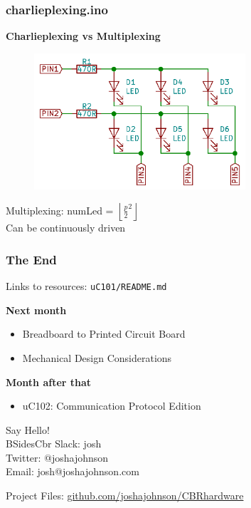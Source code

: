\documentclass[t]{beamer}
\begin{document}

\begin{frame}[t]
\frametitle{charlieplexing.ino}
\textbf{Charlieplexing vs Multiplexing}

\begin{figure}
	\includegraphics[width=0.7\textwidth]{multiPlexing.png}
\end{figure}
\centering
Multiplexing: numLed = $\left \lfloor{\frac{p}{2}^2}\right \rfloor$ \\
Can be continuously driven 

\end{frame}



\begin{frame}
\frametitle{The End}
Links to resources: \texttt{uC101/README.md}
\vspace{5mm}

\textbf{Next month}
\begin{itemize}
	\item Breadboard to Printed Circuit Board
	\item Mechanical Design Considerations	
\end{itemize}
\vspace{3mm}
\textbf{Month after that}
\begin{itemize}
	\item uC102: Communication Protocol Edition	
\end{itemize}

\vspace{5mm}
Say Hello! \\
BSidesCbr Slack: josh\\
Twitter:  @\textunderscore joshajohnson\\
Email: josh@joshajohnson.com\\
\vspace{4mm}

Project Files: \url{github.com/joshajohnson/CBRhardware}\\\end{frame}
\end{document}
